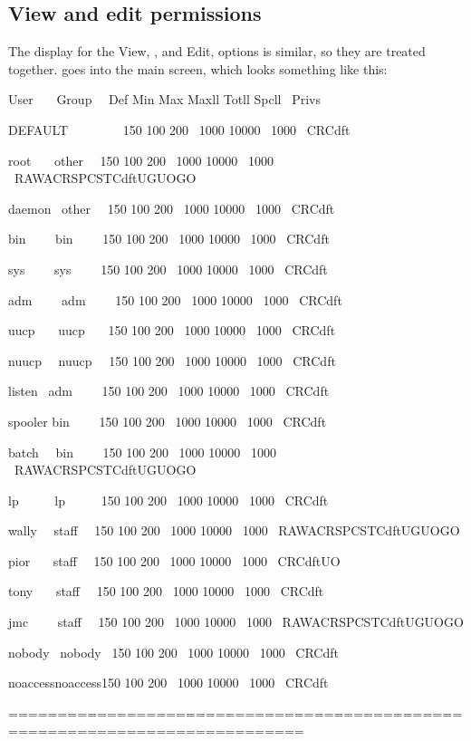 \subsection{View and edit permissions}
The display for the View, , and Edit,  options is similar, so they are treated
together. \PrBtuser{} goes into the main screen, which looks something like this:

\pagebreak[18]
\begin{exparasmall}

User \ \ \ Group \ \ Def Min Max Maxll Totll Spcll \ Privs

DEFAULT \ \ \ \ \ \ \ \ 150 100 200 \ 1000 10000 \ 1000
\ CR{\textbar}Cdft

\bigskip


root \ \ \ other \ \ 150 100 200 \ 1000 10000 \ 1000
\ RA{\textbar}WA{\textbar}CR{\textbar}SPC{\textbar}ST{\textbar}Cdft{\textbar}UG{\textbar}UO{\textbar}GO

daemon \ other \ \ 150 100 200 \ 1000 10000 \ 1000 \ CR{\textbar}Cdft

bin \ \ \ \ bin \ \ \ \ 150 100 200 \ 1000 10000 \ 1000
\ CR{\textbar}Cdft

sys \ \ \ \ sys \ \ \ \ 150 100 200 \ 1000 10000 \ 1000
\ CR{\textbar}Cdft

adm \ \ \ \ adm \ \ \ \ 150 100 200 \ 1000 10000 \ 1000
\ CR{\textbar}Cdft

uucp \ \ \ uucp \ \ \ 150 100 200 \ 1000 10000 \ 1000
\ CR{\textbar}Cdft

nuucp \ \ nuucp \ \ 150 100 200 \ 1000 10000 \ 1000 \ CR{\textbar}Cdft

listen \ adm \ \ \ \ 150 100 200 \ 1000 10000 \ 1000 \ CR{\textbar}Cdft

spooler bin \ \ \ \ 150 100 200 \ 1000 10000 \ 1000 \ CR{\textbar}Cdft

batch \ \ bin \ \ \ \ 150 100 200 \ 1000 10000 \ 1000
\ RA{\textbar}WA{\textbar}CR{\textbar}SPC{\textbar}ST{\textbar}Cdft{\textbar}UG{\textbar}UO{\textbar}GO

lp \ \ \ \ \ lp \ \ \ \ \ 150 100 200 \ 1000 10000 \ 1000
\ CR{\textbar}Cdft

wally \ \ staff \ \ 150 100 200 \ 1000 10000 \ 1000
\ RA{\textbar}WA{\textbar}CR{\textbar}SPC{\textbar}ST{\textbar}Cdft{\textbar}UG{\textbar}UO{\textbar}GO

pior \ \ \ staff \ \ 150 100 200 \ 1000 10000 \ 1000
\ CR{\textbar}Cdft{\textbar}UO

tony \ \ \ staff \ \ 150 100 200 \ 1000 10000 \ 1000 \ CR{\textbar}Cdft

jmc \ \ \ \ staff \ \ 150 100 200 \ 1000 10000 \ 1000
\ RA{\textbar}WA{\textbar}CR{\textbar}SPC{\textbar}ST{\textbar}Cdft{\textbar}UG{\textbar}UO{\textbar}GO

nobody \ nobody \ 150 100 200 \ 1000 10000 \ 1000 \ CR{\textbar}Cdft

noaccessnoaccess150 100 200 \ 1000 10000 \ 1000 \ CR{\textbar}Cdft

\bigskip


============================================================================

\end{exparasmall}

